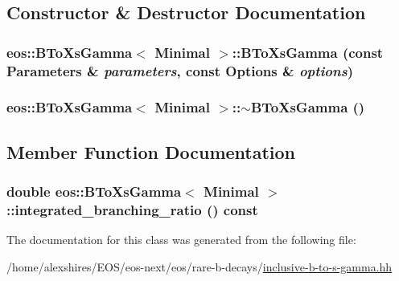 \subsection{Constructor \& Destructor Documentation}
\hypertarget{classeos_1_1BToXsGamma_3_01Minimal_01_4_abe02af7813b12fb3bcc1909806eba93d}{
\subsubsection[{BToXsGamma}]{\setlength{\rightskip}{0pt plus 5cm}eos::BToXsGamma$<$ {\bf Minimal} $>$::BToXsGamma (const {\bf Parameters} \& {\em parameters}, \/  const {\bf Options} \& {\em options})}}
\label{classeos_1_1BToXsGamma_3_01Minimal_01_4_abe02af7813b12fb3bcc1909806eba93d}
\hypertarget{classeos_1_1BToXsGamma_3_01Minimal_01_4_a2e995b56bfbd99b8f67dd1f3a17bc984}{
\subsubsection[{$\sim$BToXsGamma}]{\setlength{\rightskip}{0pt plus 5cm}eos::BToXsGamma$<$ {\bf Minimal} $>$::$\sim$BToXsGamma ()}}
\label{classeos_1_1BToXsGamma_3_01Minimal_01_4_a2e995b56bfbd99b8f67dd1f3a17bc984}


\subsection{Member Function Documentation}
\hypertarget{classeos_1_1BToXsGamma_3_01Minimal_01_4_a9356eb8a11e4f54532b3f47d17d16bad}{
\subsubsection[{integrated\_\-branching\_\-ratio}]{\setlength{\rightskip}{0pt plus 5cm}double eos::BToXsGamma$<$ {\bf Minimal} $>$::integrated\_\-branching\_\-ratio () const}}
\label{classeos_1_1BToXsGamma_3_01Minimal_01_4_a9356eb8a11e4f54532b3f47d17d16bad}


The documentation for this class was generated from the following file:\begin{DoxyCompactItemize}
\item 
/home/alexshires/EOS/eos-\/next/eos/rare-\/b-\/decays/\hyperlink{inclusive-b-to-s-gamma_8hh}{inclusive-\/b-\/to-\/s-\/gamma.hh}\end{DoxyCompactItemize}
